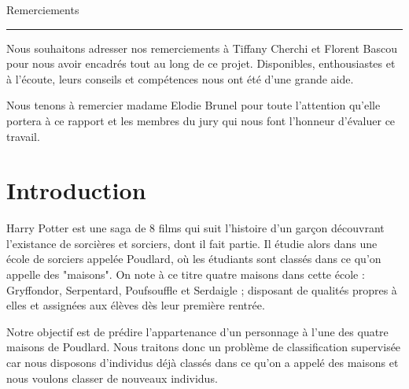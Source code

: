\documentclass[11pt]{article}
\begin{document}
\newpage

\begin{center}
    
\thispagestyle{empty}
\setcounter{page}{0}
{\huge{\bf \begin{center} Remerciements
\end{center}  } }
\vspace{0.25cm} 
\hrule
\vspace{2.5cm} 
\textit{}
\end{center}\begin{center}

Nous souhaitons adresser nos remerciements à Tiffany Cherchi et Florent Bascou pour nous avoir encadrés tout au long de ce projet. Disponibles, enthousiastes et à l'écoute, leurs conseils et compétences nous ont été d'une grande aide.\par

\vspace{0.5cm}

Nous tenons à remercier madame Elodie Brunel pour toute l'attention qu'elle portera à ce rapport et les membres du jury qui nous font l'honneur d’évaluer ce travail.

\newpage

\thispagestyle{plain} %
\mbox{}

\renewcommand{\contentsname}{Sommaire}
\tableofcontents
\newpage

\renewcommand\listfigurename{Liste des figures}
\listoffigures
\newpage

\section{Introduction}

Harry Potter est une saga de 8 films qui suit l'histoire d'un garçon découvrant l'existance de sorcières et sorciers, dont il fait partie. Il étudie alors dans une école de sorciers appelée Poudlard, où les étudiants sont classés dans ce qu'on appelle des "maisons".
On note à ce titre quatre maisons dans cette école : Gryffondor, Serpentard, Poufsouffle et Serdaigle ; disposant de qualités propres à elles et assignées aux élèves dès leur première rentrée.\par
Notre objectif est de prédire l'appartenance d'un personnage à l'une des quatre maisons de Poudlard.
Nous traitons donc un problème de classification supervisée car nous disposons d’individus déjà classés dans ce qu’on a appelé des maisons et nous voulons classer de nouveaux individus.\par


\end{center}
\end{document}
